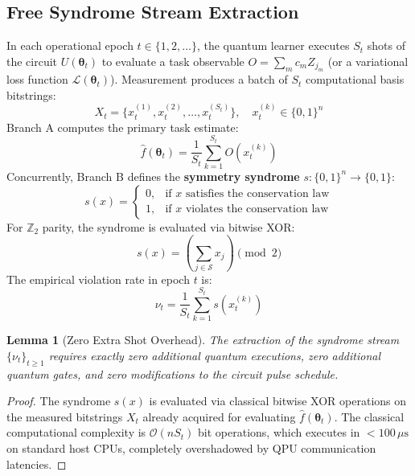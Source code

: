\documentclass[aps,pra,twocolumn,superscriptaddress,10pt,floatfix]{revtex4-2}
\newtheorem{lemma}{Lemma}
\begin{document}
\subsection{Free Syndrome Stream Extraction}
In each operational epoch $t \in \{1, 2, \dots\}$, the quantum learner executes $S_t$ shots of the circuit $U(\boldsymbol{\theta}_t)$ to evaluate a task observable $O = \sum_m c_m Z_{j_m}$ (or a variational loss function $\mathcal{L}(\boldsymbol{\theta}_t)$). Measurement produces a batch of $S_t$ computational basis bitstrings:
\begin{equation}
X_t = \{x_t^{(1)}, x_t^{(2)}, \dots, x_t^{(S_t)}\}, \quad x_t^{(k)} \in \{0, 1\}^n
\end{equation}
Branch A computes the primary task estimate:
\begin{equation}
\hat{f}(\boldsymbol{\theta}_t) = \frac{1}{S_t} \sum_{k=1}^{S_t} O(x_t^{(k)})
\end{equation}
Concurrently, Branch B defines the \textbf{symmetry syndrome} $s: \{0, 1\}^n \to \{0, 1\}$:
\begin{equation}
s(x) = \begin{cases} 0, & \text{if } x \text{ satisfies the conservation law} \\ 1, & \text{if } x \text{ violates the conservation law} \end{cases}
\end{equation}
For $\mathbb{Z}_2$ parity, the syndrome is evaluated via bitwise XOR:
\begin{equation}
s(x) = \left( \sum_{j \in \mathcal{S}} x_j \right) \pmod 2
\end{equation}
The empirical violation rate in epoch $t$ is:
\begin{equation}
\nu_t = \frac{1}{S_t} \sum_{k=1}^{S_t} s(x_t^{(k)})
\end{equation}

\begin{lemma}[Zero Extra Shot Overhead]
\label{lem:zero_overhead}
The extraction of the syndrome stream $\{\nu_t\}_{t \ge 1}$ requires exactly zero additional quantum executions, zero additional quantum gates, and zero modifications to the circuit pulse schedule.
\end{lemma}
\begin{proof}
The syndrome $s(x)$ is evaluated via classical bitwise XOR operations on the measured bitstrings $X_t$ already acquired for evaluating $\hat{f}(\boldsymbol{\theta}_t)$. The classical computational complexity is $\mathcal{O}(n S_t)$ bit operations, which executes in $< 100\,\mu\text{s}$ on standard host CPUs, completely overshadowed by QPU communication latencies.
\end{proof}
\end{document}
